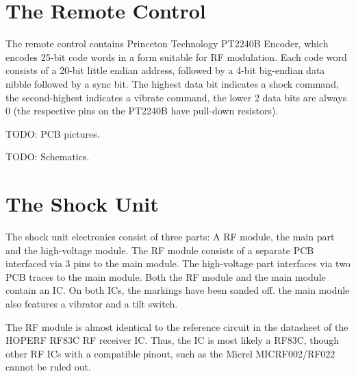 \documentclass[a4paper]{article}
\begin{document}
\section{The Remote Control}

The remote control contains Princeton Technology PT2240B Encoder, which encodes 25-bit code words in a form suitable for RF modulation. Each code word consists of a 20-bit little endian address, followed by a 4-bit big-endian data nibble followed by a sync bit. The highest data bit indicates a shock command, the second-highest indicates a vibrate command, the lower 2 data bits are always 0 (the respective pins on the PT2240B have pull-down resistors).

TODO: PCB pictures.

TODO: Schematics.

\section{The Shock Unit}

The shock unit electronics consist of three parts: A RF module, the main part and the high-voltage module. The RF module consists of a separate PCB interfaced via 3 pins to the main module. The high-voltage part interfaces via two PCB traces to the main module. Both the RF module and the main module contain an IC. On both ICs, the markings have been sanded off. the main module also features a vibrator and a tilt switch.

The RF module is almost identical to the reference circuit in the datasheet of the HOPERF RF83C RF receiver IC. Thus, the IC is most likely a RF83C, though other RF ICs with a compatible pinout, such as the Micrel MICRF002/RF022 cannot be ruled out.
\end{document}
